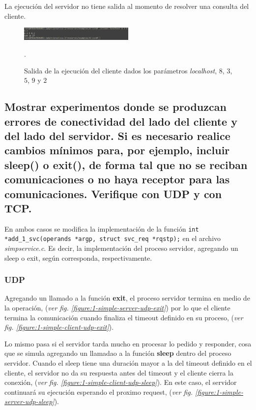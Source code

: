 \documentclass[osajnl,twocolumn,showpacs,superscriptaddress,10pt]{revtex4-1} %
\begin{document}
La ejecución del servidor no tiene salida al momento de resolver una consulta del cliente.

\begin{figure}[H]
    \centering
    \includegraphics[width=0.5\textwidth]{capturas/4-list-client}
    \caption{Salida de la ejecución del cliente dados los parámetros \textit{localhost}, $8$, $3$, $5$, $9$ y $2$}.
    \label{figure:4-list-client}
\end{figure}

\subsection{Mostrar experimentos donde se produzcan errores de conectividad del lado del cliente y
del lado del servidor. Si es necesario realice cambios mínimos para, por ejemplo, incluir
sleep() o exit(), de forma tal que no se reciban comunicaciones o no haya receptor para
las comunicaciones. Verifique con UDP y con TCP.}

En ambos casos se modifica la implementación de la función \texttt{int *add_1_svc(operands *argp, struct svc_req *rqstp);} en el archivo \textit{simpservice.c}. Es decir, la implementación del proceso servidor, agregando un sleep o exit, según corresponda, respectivamente.

\subsubsection{UDP}
  Agregando un llamado a la función \textbf{exit}, el proceso servidor termina en medio de la operación, (\textit{ver fig. \ref{figure:1-simple-server-udp-exit}}) por lo que el cliente termina la comunicación cuando finaliza el timeout definido en su proceso, (\textit{ver fig. \ref{figure:1-simple-client-udp-exit}}).
  
  Lo mismo pasa si el servidor tarda mucho en procesar lo pedido y responder, cosa que se simula agregando un llamadao a la función \textbf{sleep} dentro del proceso servidor. Cuando el sleep tiene una duración mayor a la del timeout definido en el cliente, el servidor no da su respuesta antes del timeout y el cliente cierra la conexión, (\textit{ver fig. \ref{figure:1-simple-client-udp-sleep}}). En este caso, el servidor continuará su ejecución esperando el proximo request, (\textit{ver fig. \ref{figure:1-simple-server-udp-sleep}}).
  
\end{document}
